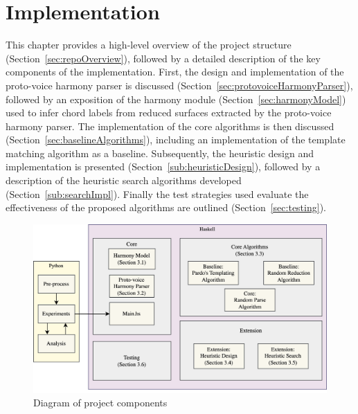 \documentclass[12pt,a4paper,twoside,openany]{report} \usepackage[pdfborder={0 0 0}]{hyperref}    %
\theoremstyle{definition} \newtheorem{definition}{Definition}[section]
\begin{document}

    \chapter{Implementation}
    \label{chap:implementation}
    This chapter provides a high-level overview of the project structure (Section~\ref{sec:repoOverview}),
    followed by a detailed description of the key components of the implementation. 
    First, the design and implementation of the proto-voice harmony parser is discussed 
    (Section~\ref{sec:protovoiceHarmonyParser}), followed by an exposition of the harmony module
    (Section~\ref{sec:harmonyModel}) used to infer chord labels from reduced surfaces extracted by the proto-voice
    harmony parser. The implementation of the core algorithms is then discussed (Section~\ref{sec:baselineAlgorithms}), 
    including an implementation of the template matching algorithm \cite{pardoAlgorithmsChordalAnalysis2002} as a baseline. 
    Subsequently, the heuristic design and implementation is presented (Section~\ref{sub:heuristicDesign}), followed by 
    a description of the heuristic search algorithms developed (Section~\ref{sub:searchImpl}). 
    Finally the test strategies used evaluate the effectiveness of the proposed algorithms are outlined (Section~\ref{sec:testing}).

    \begin{figure}[h] 
    \centering 
    \includegraphics[width=\textwidth]{figs/impl/blockDiag/DissBlockDiagram.png} 
    \caption{Diagram of project components} 
    \label{fig:blockDiagram} 
    \end{figure}
\end{document}
